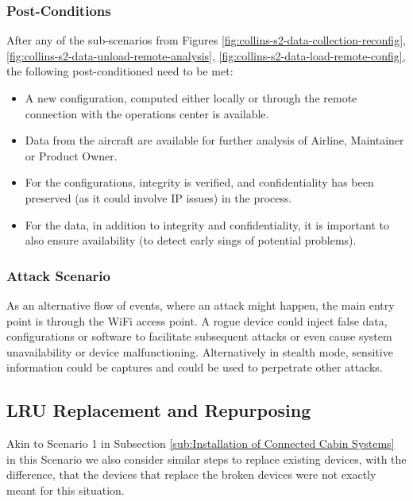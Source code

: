 \subsubsection{Post-Conditions}

After any of the sub-scenarios from Figures \ref{fig:collins-s2-data-collection-reconfig},
\ref{fig:collins-s2-data-unload-remote-analysis}, \ref{fig:collins-s2-data-load-remote-config}, the following
post-conditioned need to be met:

\begin{itemize}
	\item A new configuration, computed either locally or through the remote connection with the operations center
	      is available.
	\item Data from the aircraft are available for further analysis of Airline, Maintainer or Product Owner.
	\item For the configurations, integrity is verified, and confidentiality has been preserved (as it could
	      involve IP issues) in the process.
	\item For the data, in addition to integrity and confidentiality, it is important to also ensure availability
	      (to detect early sings of potential problems).

\end{itemize}

\subsubsection{Attack Scenario}

As an alternative flow of events, where an attack might happen, the main entry point is through the WiFi access point.
A rogue device could inject false data, configurations or software to facilitate subsequent attacks or even cause system
unavailability or device malfunctioning.
Alternatively in stealth mode, sensitive information could be captures and could be used to perpetrate other attacks.


\subsection{LRU Replacement and Repurposing} %
\label{sub:LRU Replacement and Repurposing}

Akin to Scenario 1 in Subsection \ref{sub:Installation of Connected Cabin Systems} in this Scenario we also consider
similar steps to replace existing devices, with the difference, that the devices that replace the broken devices were
not exactly meant for this situation.

